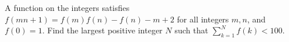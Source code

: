 A function on the integers satisfies $f(mn+1)=f(m)f(n)-f(n)-m+2$ for all integers $m,n$, and $f(0)=1$. Find the largest positive integer $N$ such that $\sum_{k=1}^N f(k)<100$.
